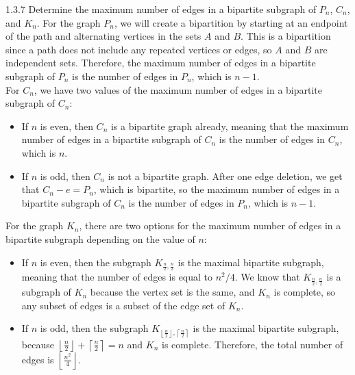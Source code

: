 \documentclass[9pt]{extarticle}
\begin{document}
  \begin{problem}{1.3.7}
    Determine the maximum number of edges in a bipartite subgraph of $P_n$, $C_n$, and $K_n$.
    \tcblower
    For the graph $P_n$, we will create a bipartition by starting at an endpoint of the path and alternating vertices in the sets $A$ and $B$. This is a bipartition since a path does not include any repeated vertices or edges, so $A$ and $B$ are independent sets. Therefore, the maximum number of edges in a bipartite subgraph of $P_n$ is the number of edges in $P_n$, which is $n-1$.\\

    For $C_n$, we have two values of the maximum number of edges in a bipartite subgraph of $C_n$:
    \begin{itemize}
      \item If $n$ is even, then $C_n$ is a bipartite graph already, meaning that the maximum number of edges in a bipartite subgraph of $C_n$ is the number of edges in $C_n$, which is $n$.
      \item If $n$ is odd, then $C_n$ is not a bipartite graph. After one edge deletion, we get that $C_n - e = P_n$, which is bipartite, so the maximum number of edges in a bipartite subgraph of $C_n$ is the number of edges in $P_n$, which is $n-1$.
    \end{itemize}
    For the graph $K_n$, there are two options for the maximum number of edges in a bipartite subgraph depending on the value of $n$:
    \begin{itemize}
      \item If $n$ is even, then the subgraph $K_{\frac{n}{2},\frac{n}{2}}$ is the maximal bipartite subgraph, meaning that the number of edges is equal to $n^2/4$. We know that $K_{\frac{n}{2},\frac{n}{2}}$ is a subgraph of $K_n$ because the vertex set is the same, and $K_n$ is complete, so any subset of edges is a subset of the edge set of $K_n$.
      \item If $n$ is odd, then the subgraph $K_{\left\lfloor \frac{n}{2}\right\rfloor, \left\lceil \frac{n}{2}\right\rceil}$ is the maximal bipartite subgraph, because $\left\lfloor \frac{n}{2}\right\rfloor + \left\lceil \frac{n}{2}\right\rceil = n$ and $K_n$ is complete. Therefore, the total number of edges is $\left\lfloor \frac{n^2}{4}\right\rfloor$.
    \end{itemize}
  \end{problem}
\end{document}
